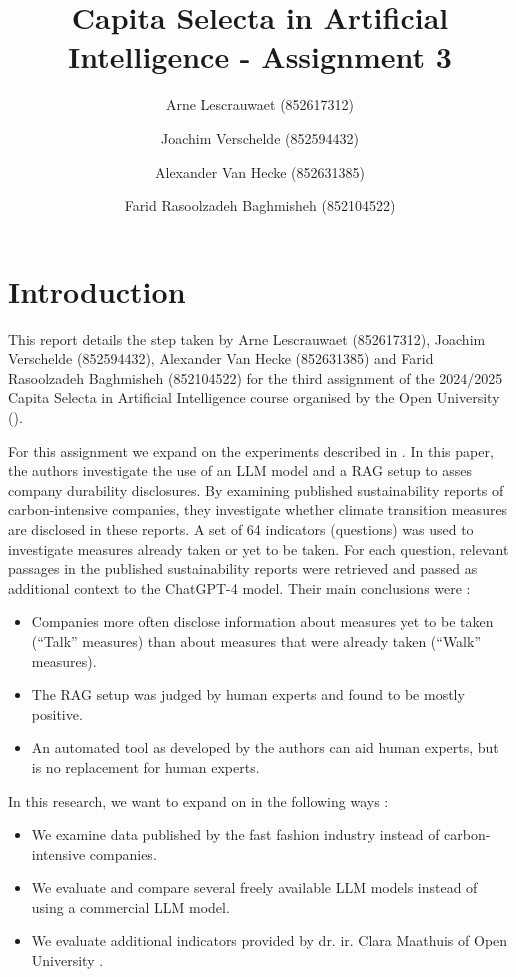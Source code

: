 \documentclass[]{article}
\title{Capita Selecta in Artificial Intelligence - Assignment 3}
\author{Arne Lescrauwaet \small(852617312) \and Joachim Verschelde \small(852594432) \and Alexander Van Hecke \small(852631385) \and Farid Rasoolzadeh Baghmisheh \small(852104522)}
\begin{document}
\maketitle

\section{Introduction} \label{sec:introduction}
This report details the step taken by Arne Lescrauwaet (852617312), Joachim Verschelde (852594432), Alexander Van Hecke (852631385) and Farid Rasoolzadeh Baghmisheh (852104522) for the third assignment of the 2024/2025 Capita Selecta in Artificial Intelligence course organised by the Open University (\cite{ou}).

For this assignment we expand on the experiments described in \cite{durability}.
In this paper, the authors investigate the use of an LLM model and a RAG setup \cite{rag} to asses company durability disclosures.
By examining published sustainability reports of carbon-intensive companies, they investigate whether climate transition measures are disclosed in these reports.
A set of 64 indicators (questions) was used to investigate measures already taken or yet to be taken.
For each question, relevant passages in the published sustainability reports were retrieved and passed as additional context to the ChatGPT-4 model.
Their main conclusions were :

\begin{itemize}
    \item Companies more often disclose information about measures yet to be taken (``Talk'' measures) than about measures that were already taken (``Walk'' measures).
    \item The RAG setup was judged by human experts and found to be mostly positive.
    \item An automated tool as developed by the authors can aid human experts, but is no replacement for human experts.
\end{itemize}

In this research, we want to expand on \cite{durability} in the following ways :

\begin{itemize}
    \item We examine data published by the fast fashion industry instead of carbon-intensive companies.
    \item We evaluate and compare several freely available LLM models instead of using a commercial LLM model.
    \item We evaluate additional indicators provided by dr. ir. Clara Maathuis of Open University \cite{ou}.
\end{itemize}
\end{document}
